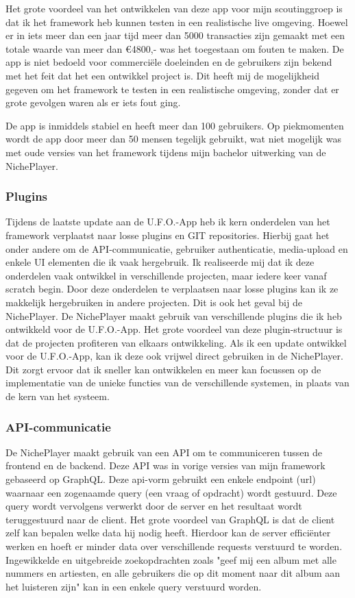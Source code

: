 Het grote voordeel van het ontwikkelen van deze app voor mijn scoutinggroep is dat ik het framework heb kunnen testen in een realistische live omgeving. Hoewel er in iets meer dan een jaar tijd meer dan 5000 transacties zijn gemaakt met een totale waarde van meer dan €4800,- was het toegestaan om fouten te maken. De app is niet bedoeld voor commerciële doeleinden en de gebruikers zijn bekend met het feit dat het een ontwikkel project is. Dit heeft mij de mogelijkheid gegeven om het framework te testen in een realistische omgeving, zonder dat er grote gevolgen waren als er iets fout ging.

De app is inmiddels stabiel en heeft meer dan 100 gebruikers. Op piekmomenten wordt de app door meer dan 50 mensen tegelijk gebruikt, wat niet mogelijk was met oude versies van het framework tijdens mijn bachelor uitwerking van de NichePlayer.

\subsubsection*{Plugins}
Tijdens de laatste update aan de U.F.O.-App heb ik kern onderdelen van het framework verplaatst naar losse plugins en GIT repositories. Hierbij gaat het onder andere om de API-communicatie, gebruiker authenticatie, media-upload en enkele UI elementen die ik vaak hergebruik. Ik realiseerde mij dat ik deze onderdelen vaak ontwikkel in verschillende projecten, maar iedere keer vanaf scratch begin. Door deze onderdelen te verplaatsen naar losse plugins kan ik ze makkelijk hergebruiken in andere projecten. Dit is ook het geval bij de NichePlayer. De NichePlayer maakt gebruik van verschillende plugins die ik heb ontwikkeld voor de U.F.O.-App. Het grote voordeel van deze plugin-structuur is dat de projecten profiteren van elkaars ontwikkeling. Als ik een update ontwikkel voor de U.F.O.-App, kan ik deze ook vrijwel direct gebruiken in de NichePlayer. Dit zorgt ervoor dat ik sneller kan ontwikkelen en meer kan focussen op de implementatie van de unieke functies van de verschillende systemen, in plaats van de kern van het systeem.

\subsubsection*{API-communicatie}
De NichePlayer maakt gebruik van een API om te communiceren tussen de frontend en de backend. Deze API was in vorige versies van mijn framework gebaseerd op GraphQL. Deze api-vorm gebruikt een enkele endpoint (url) waarnaar een zogenaamde query (een vraag of opdracht) wordt gestuurd. Deze query wordt vervolgens verwerkt door de server en het resultaat wordt teruggestuurd naar de client. Het grote voordeel van GraphQL is dat de client zelf kan bepalen welke data hij nodig heeft. Hierdoor kan de server efficiënter werken en hoeft er minder data over verschillende requests verstuurd te worden. Ingewikkelde en uitgebreide zoekopdrachten zoals "geef mij een album met alle nummers en artiesten, en alle gebruikers die op dit moment naar dit album aan het luisteren zijn" kan in een enkele query verstuurd worden.

